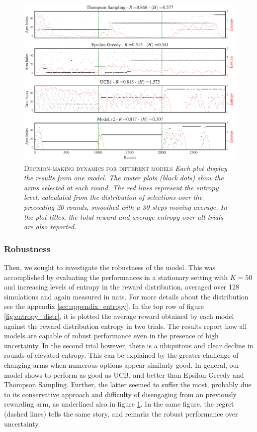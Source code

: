 \begin{figure}[H]
    \centering
    \includegraphics[width=1.0\textwidth]{figures/performance_analysis_KABv0.png}
    \caption{\textsc{Decision-making dynamics for different models} \textit{Each plot display the results from one model. The raster plots (black dots) show the arms selected at each round.
The red lines represent the entropy level, calculated from the distribution of selections over the preceeding 20 rounds, smoothed with a 30-steps moving average. In the plot titles, the total reward and average entropy over all trials are also reported.}}
    \label{fig:entropy_fig1}
\end{figure}


\subsubsection{Robustness}

\noindent Then, we sought to investigate the robustness of the model.
This was accomplished by evaluating the performances in a stationary setting with $K=50$ and increasing levels of entropy in the reward distribution, averaged over 128 simulations and again measured in nats.
For more details about the distribution see the appendix \ref{sec:appendix_entropy}.
In the top row of figure \ref{fig:entropy_distr}, it is plotted the average reward obtained by each model against the reward distribution entropy in two trials.
The results report how all models are capable of robust performance even in the presence of high uncertainty.
In the second trial however, there is a ubiquitous and clear decline in rounds of elevated entropy. This can be explained by the greater challenge of changing arms when numerous options appear similarly good.
In general, our model shows to perform as good as UCB, and better than Epsilon-Greedy and Thompson Sampling.
Further, the latter seemed to suffer the most, probably due to its conservative approach and difficulty of disengaging from an previously rewarding arm, as underlined also in figure \ref{fig:entropy_fig1}.
In the same figure, the regret (dashed lines) tells the same story, and remarks the robust performance over uncertainty.

